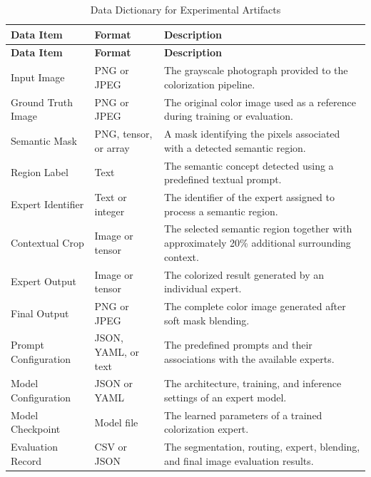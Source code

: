 \documentclass{FastFyp}
\begin{document}
\begin{longtable}{|p{3.2cm}|p{3.0cm}|p{7.4cm}|}
\caption{Data Dictionary for Experimental Artifacts}
\label{tab:data-dictionary}\\
\hline
\textbf{Data Item} & \textbf{Format} & \textbf{Description} \\ \hline
\endfirsthead

\hline
\textbf{Data Item} & \textbf{Format} & \textbf{Description} \\ \hline
\endhead

Input Image &
PNG or JPEG &
The grayscale photograph provided to the colorization pipeline. \\ \hline

Ground Truth Image &
PNG or JPEG &
The original color image used as a reference during training or evaluation. \\ \hline

Semantic Mask &
PNG, tensor, or array &
A mask identifying the pixels associated with a detected semantic region. \\ \hline

Region Label &
Text &
The semantic concept detected using a predefined textual prompt. \\ \hline

Expert Identifier &
Text or integer &
The identifier of the expert assigned to process a semantic region. \\ \hline

Contextual Crop &
Image or tensor &
The selected semantic region together with approximately 20\% additional surrounding context. \\ \hline

Expert Output &
Image or tensor &
The colorized result generated by an individual expert. \\ \hline

Final Output &
PNG or JPEG &
The complete color image generated after soft mask blending. \\ \hline

Prompt Configuration &
JSON, YAML, or text &
The predefined prompts and their associations with the available experts. \\ \hline

Model Configuration &
JSON or YAML &
The architecture, training, and inference settings of an expert model. \\ \hline

Model Checkpoint &
Model file &
The learned parameters of a trained colorization expert. \\ \hline

Evaluation Record &
CSV or JSON &
The segmentation, routing, expert, blending, and final image evaluation results. \\ \hline

\end{longtable}
\end{document}
